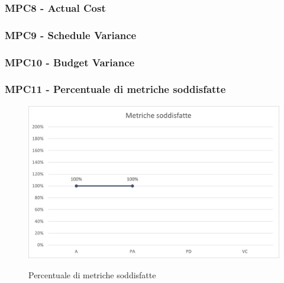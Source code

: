 \subsubsection{MPC8 - Actual Cost}

\subsubsection{MPC9 - Schedule Variance}

\subsubsection{MPC10 - Budget Variance}


\subsubsection{MPC11 - Percentuale di metriche soddisfatte}
\begin{figure}[H]
\centering
\includegraphics[scale=0.90]{res/ResocontoAttivitaDiVerifica/res/metriche/grafici/img/metricheSoddisfatte.png}\\
\caption{Percentuale di metriche soddisfatte}
\end{figure}

